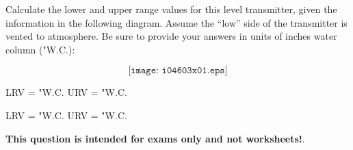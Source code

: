 

Calculate the lower and upper range values for this level transmitter, given the information in the following diagram.  Assume the ``low'' side of the transmitter is vented to atmosphere.  Be sure to provide your answers in units of inches water column ("W.C.):

$$\texttt{[image: i04603x01.eps]}$$

LRV = \underbar{\hskip 50pt} "W.C. \hskip 100pt URV = \underbar{\hskip 50pt} "W.C.







LRV =  "W.C. \hskip 100pt URV =  "W.C.







{\bf This question is intended for exams only and not worksheets!}.



